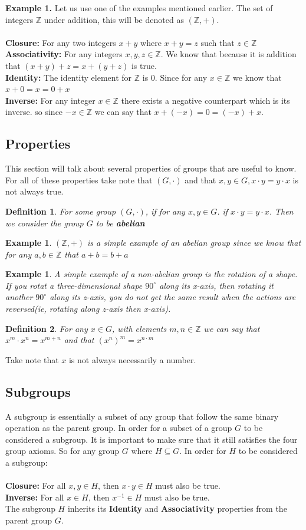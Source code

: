 \documentclass[12pt,journal,compsoc]{IEEEtran}
\newcommand{\Z}{\mathbb{Z}}
\newtheorem{definition}{Definition}
\newtheorem{ex}[thm]{Example}
\begin{document}
\textbf{Example 1.} Let us use one of the examples mentioned earlier. The set of integers $\Z$ under addition, this will be denoted as $(\Z, +)$.\\\\
\textbf{Closure: } For any two integers $x + y$ where $x + y = z$ such that $z \in \Z$\\
\textbf{Associativity: } For any integers $x,y,z \in \Z$. We know that because it is addition that $(x + y) + z = x + (y + z)$ is true.\\
\textbf{Identity: } The identity element for $\Z$ is $0$. Since for any $x \in \Z$ we know that $x + 0 = x = 0 + x$\\
\textbf{Inverse: } For any integer $x \in \Z$ there exists a negative counterpart which is its inverse. so since $-x \in \Z$ we can say that $x + (-x) = 0 = (-x) + x$.
\subsection{Properties}
This section will talk about several properties of groups that are useful to know. For all of these properties take note that $(G, \cdot )$ and that $x,y \in G, x \cdot y = y \cdot x$ is not always true.
\begin{definition}
For some group $(G, \cdot)$, if for any $x, y \in G$. if $x \cdot y = y \cdot x$. Then we consider the group $G$ to be \textbf{abelian}
\end{definition}
\begin{ex}
$(\Z, +)$ is a simple example of an abelian group since we know that for any $a, b \in \Z$ that $a + b = b + a$
\end{ex}
\begin{ex}
A simple example of a non-abelian group is the rotation of a shape. If you rotat a three-dimensional shape $90^{\circ}$ along its x-axis, then rotating it another $90^{\circ}$ along its z-axis, you do not get the same result when the actions are reversed(ie, rotating along z-axis then x-axis).
\end{ex}
\begin{definition}
For any $x \in G$, with elements $m,n \in \Z$ we can say that $x^m \cdot x^n = x^{m+n}$ and that $(x^n)^m = x^{n \cdot m}$
\end{definition}
Take note that $x$ is not always necessarily a number.
\subsection{Subgroups}
A subgroup is essentially a subset of any group that follow the same binary operation as the parent group. In order for a subset of a group $G$ to be considered a subgroup. It is important to make sure that it still satisfies the four group axioms. So for any group $G$ where $H \subseteq G$. In order for $H$ to be considered a subgroup:\\\\
\textbf{Closure: } For all $x,y \in H$, then $x \cdot y \in H$ must also be true.\\
\textbf{Inverse: } For all $x \in H$, then $x^{-1} \in H$ must also be true.\\
The subgroup $H$ inherits its \textbf{Identity} and \textbf{Associativity} properties from the parent group $G$.
\end{document}
